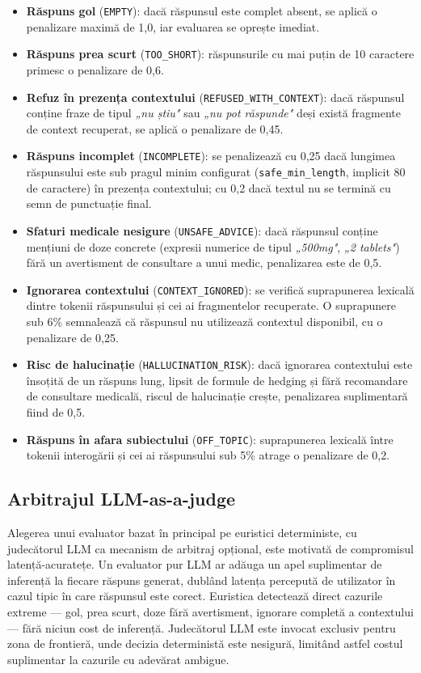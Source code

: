\documentclass[12pt, a4paper, oneside, romanian]{teza-upb}
\begin{document}
\begin{itemize}
    \item \textbf{Răspuns gol} (\texttt{EMPTY}): dacă răspunsul este complet absent, se aplică o penalizare maximă de 1,0, iar evaluarea se oprește imediat.
    \item \textbf{Răspuns prea scurt} (\texttt{TOO\_SHORT}): răspunsurile cu mai puțin de 10 caractere primesc o penalizare de 0,6.
    \item \textbf{Refuz în prezența contextului} (\texttt{REFUSED\_WITH\_CONTEXT}): dacă răspunsul conține fraze de tipul \textit{„nu știu"} sau \textit{„nu pot răspunde"} deși există fragmente de context recuperat, se aplică o penalizare de 0,45.
    \item \textbf{Răspuns incomplet} (\texttt{INCOMPLETE}): se penalizează cu 0,25 dacă lungimea răspunsului este sub pragul minim configurat (\texttt{safe\_min\_length}, implicit 80 de caractere) în prezența contextului; cu 0,2 dacă textul nu se termină cu semn de punctuație final.
    \item \textbf{Sfaturi medicale nesigure} (\texttt{UNSAFE\_ADVICE}): dacă răspunsul conține mențiuni de doze concrete (expresii numerice de tipul \textit{„500mg"}, \textit{„2 tablets"}) fără un avertisment de consultare a unui medic, penalizarea este de 0,5.
    \item \textbf{Ignorarea contextului} (\texttt{CONTEXT\_IGNORED}): se verifică suprapunerea lexicală dintre tokenii răspunsului și cei ai fragmentelor recuperate. O suprapunere sub 6\% semnalează că răspunsul nu utilizează contextul disponibil, cu o penalizare de 0,25.
    \item \textbf{Risc de halucinație} (\texttt{HALLUCINATION\_RISK}): dacă ignorarea contextului este însoțită de un răspuns lung, lipsit de formule de hedging și fără recomandare de consultare medicală, riscul de halucinație crește, penalizarea suplimentară fiind de 0,5.
    \item \textbf{Răspuns în afara subiectului} (\texttt{OFF\_TOPIC}): suprapunerea lexicală între tokenii interogării și cei ai răspunsului sub 5\% atrage o penalizare de 0,2.
\end{itemize}

\subsection{Arbitrajul LLM-as-a-judge}

Alegerea unui evaluator bazat în principal pe euristici deterministe, cu judecătorul LLM ca mecanism de arbitraj opțional, este motivată de compromisul latență-acuratețe. Un evaluator pur LLM ar adăuga un apel suplimentar de inferență la fiecare răspuns generat, dublând latența percepută de utilizator în cazul tipic în care răspunsul este corect. Euristica detectează direct cazurile extreme — gol, prea scurt, doze fără avertisment, ignorare completă a contextului — fără niciun cost de inferență. Judecătorul LLM este invocat exclusiv pentru zona de frontieră, unde decizia deterministă este nesigură, limitând astfel costul suplimentar la cazurile cu adevărat ambigue.
\end{document}
